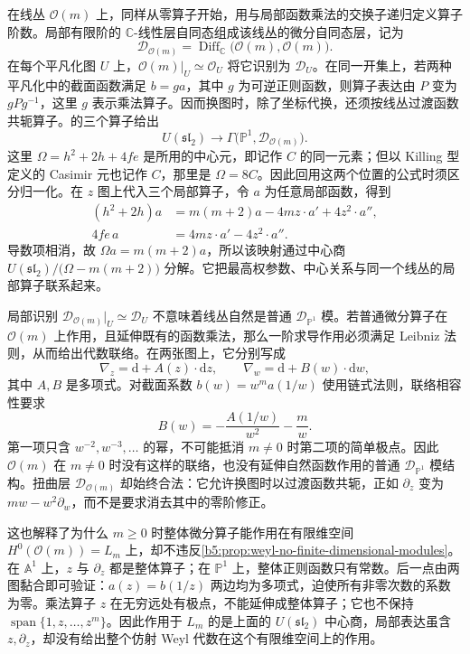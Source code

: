 \ProseParagraphBreak
在线丛 \(\mathcal O(m)\) 上，同样从零算子开始，用与局部函数乘法的交换子递归定义算子阶数。局部有限阶的 \(\mathbb C\)-线性层自同态组成该线丛的微分自同态层，记为
\[
	\mathcal D_{\mathcal O(m)} =\operatorname{Diff}_{\mathbb C}\bigl(\mathcal O(m),\mathcal O(m)\bigr).
\]
在每个平凡化图 \(U\) 上，\(\mathcal O(m)|_U\simeq\mathcal O_U\) 将它识别为 \(\mathcal D_U\)。在同一开集上，若两种平凡化中的截面函数满足 \(b=ga\)，其中 \(g\) 为可逆正则函数，则算子表达由 \(P\) 变为 \(gPg^{-1}\)，这里 \(g\) 表示乘法算子。因而换图时，除了坐标代换，还须按线丛过渡函数共轭算子。的三个算子给出
\[
	U(\mathfrak{sl}_2)\longrightarrow \Gamma\bigl(\mathbb P^1,\mathcal D_{\mathcal O(m)}\bigr).
\]
这里 \(\Omega=h^2+2h+4fe\) 是所用的中心元，即记作 \(C\) 的同一元素；但以 Killing 型定义的 Casimir 元也记作 \(C\)，那里是 \(\Omega=8C\)。因此回用这两个位置的公式时须区分归一化。在 \(z\) 图上代入三个局部算子，令 \(a\) 为任意局部函数，得到
\[
	\begin{aligned}
		(h^2+2h)a&=m(m+2)a-4mz\cdot a'+4z^2\cdot a'',\\
		4fe\,a&=4mz\cdot a'-4z^2\cdot a''.
	\end{aligned}
\]
导数项相消，故 \(\Omega a=m(m+2)a\)，所以该映射通过中心商 \(U(\mathfrak{sl}_2)/\bigl(\Omega-m(m+2)\bigr)\) 分解。它把最高权参数、中心关系与同一个线丛的局部算子联系起来。

\ProseParagraphBreak
局部识别 \(\mathcal D_{\mathcal O(m)}|_U\simeq\mathcal D_U\) 不意味着线丛自然是普通 \(\mathcal D_{\mathbb P^1}\) 模。若普通微分算子在 \(\mathcal O(m)\) 上作用，且延伸既有的函数乘法，那么一阶求导作用必须满足 Leibniz 法则，从而给出代数联络。在两张图上，它分别写成
\[
	\nabla_z=\mathrm{d}+A(z)\cdot\mathrm{d}z, \qquad \nabla_w=\mathrm{d}+B(w)\cdot\mathrm{d}w,
\]
其中 \(A,B\) 是多项式。对截面系数 \(b(w)=w^m a(1/w)\) 使用链式法则，联络相容性要求
\[
	B(w)=-\frac{A(1/w)}{w^2}-\frac m w.
\]
第一项只含 \(w^{-2},w^{-3},\ldots\) 的幂，不可能抵消 \(m\ne0\) 时第二项的简单极点。因此 \(\mathcal O(m)\) 在 \(m\ne0\) 时没有这样的联络，也没有延伸自然函数作用的普通 \(\mathcal D_{\mathbb P^1}\) 模结构。扭曲层 \(\mathcal D_{\mathcal O(m)}\) 却始终合法：它允许换图时以过渡函数共轭，正如 \(\partial_z\) 变为 \(mw-w^2\partial_w\)，而不是要求消去其中的零阶修正。

\ProseParagraphBreak
这也解释了为什么 \(m\ge0\) 时整体微分算子能作用在有限维空间 \(H^0(\mathcal O(m))=L_m\) 上，却不违反\cref{b5:prop:weyl-no-finite-dimensional-modules}。在 \(\mathbb A^1\) 上，\(z\) 与 \(\partial_z\) 都是整体算子；在 \(\mathbb P^1\) 上，整体正则函数只有常数。后一点由两图黏合即可验证：\(a(z)=b(1/z)\) 两边均为多项式，迫使所有非零次数的系数为零。乘法算子 \(z\) 在无穷远处有极点，不能延伸成整体算子；它也不保持 \(\operatorname{span}\{1,z,\ldots,z^m\}\)。因此作用于 \(L_m\) 的是上面的 \(U(\mathfrak{sl}_2)\) 中心商，局部表达虽含 \(z,\partial_z\)，却没有给出整个仿射 Weyl 代数在这个有限维空间上的作用。

